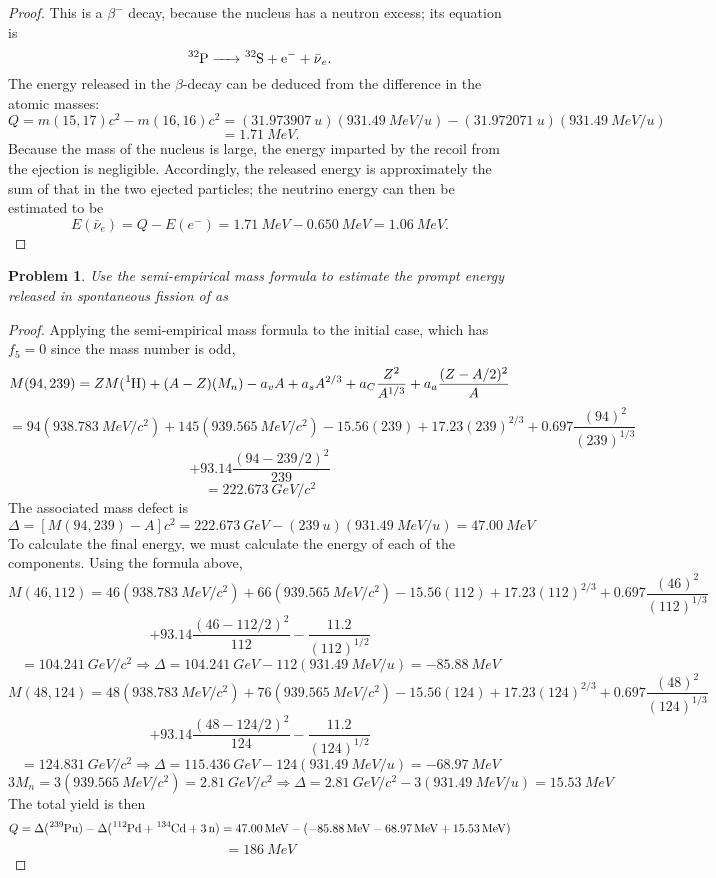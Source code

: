 \documentclass{article}
\newtheorem{plm}{Problem}
\begin{document}
\begin{proof}
  This is a $\beta^{-}$ decay, because the nucleus has a neutron excess; its equation is
  \[
    \ce{^{32}P -> ^{32}S + e^{-} + \bar{\nu}_{e}}.
  \]
  The energy released in the $\beta$-decay can be deduced from the difference in the atomic masses:
  \[
    Q = m(15, 17)c^{2} - m(16, 16)c^{2}
    = (\SI{31.973907}{u})(\SI{931.49}{MeV/u}) - (\SI{31.972071}{u})(\SI{931.49}{MeV/u})
  \]
  \[
    = \SI{1.71}{MeV}.
  \]
  Because the mass of the nucleus is large, the energy imparted by the recoil from the ejection is negligible.
  Accordingly, the released energy is approximately the sum of that in the two ejected particles; the neutrino energy can then be estimated to be
  \[
    E(\bar{\nu}_{e}) = Q - E(e^{-}) = \SI{1.71}{MeV} - \SI{0.650}{MeV} = \SI{1.06}{MeV}.
  \]
\end{proof}

\begin{plm}
  Use the semi-empirical mass formula to estimate the prompt energy released in spontaneous fission of  as
  \begin{center}
  \end{center}
\end{plm}

\begin{proof}
  Applying the semi-empirical mass formula to the initial case, which has $f_{5} = 0$ since the mass number is odd,
  \[
    M(94, 239) = ZM(\ce{^{1}H}) + (A - Z)(M_{n}) - a_{v}A + a_{s}A^{2/3} + a_{C}\frac{Z^{2}}{A^{1/3}} + a_{a}\frac{(Z - A/2)^{2}}{A}
  \]
  \[
     = 94(\SI{938.783}{MeV/c^{2}}) + 145(\SI{939.565}{MeV/c^{2}}) - 15.56(239) + 17.23(239)^{2/3} + 0.697\frac{(94)^{2}}{(239)^{1/3}}
   \]
   \[
     + 93.14\frac{(94 - 239/2)^{2}}{239}
   \]
   \[
     = \SI{222.673}{GeV/c^{2}}
   \]
   The associated mass defect is
   \[
     \Delta = [M(94, 239) - A]c^{2} = \SI{222.673}{GeV} - (\SI{239}{u})(\SI{931.49}{MeV/u}) = \SI{47.00}{MeV}
   \]
   To calculate the final energy, we must calculate the energy of each of the components.
   Using the formula above,
   \[
     M(46, 112) = 46(\SI{938.783}{MeV/c^{2}}) + 66(\SI{939.565}{MeV/c^{2}}) - 15.56(112) + 17.23(112)^{2/3} + 0.697\frac{(46)^{2}}{(112)^{1/3}}
   \]
   \[
     + 93.14\frac{(46 - 112/2)^{2}}{112} - \frac{11.2}{(112)^{1/2}}
   \]
   \[
     = \SI{104.241}{GeV/c^{2}}
     \Rightarrow \Delta = \SI{104.241}{GeV} - 112(\SI{931.49}{MeV/u}) = \SI{-85.88}{MeV}
   \]
   \[
     M(48, 124) = 48(\SI{938.783}{MeV/c^{2}}) + 76(\SI{939.565}{MeV/c^{2}}) - 15.56(124) + 17.23(124)^{2/3} + 0.697\frac{(48)^{2}}{(124)^{1/3}}
   \]
   \[
     + 93.14\frac{(48 - 124/2)^{2}}{124} - \frac{11.2}{(124)^{1/2}}
   \]
   \[
     = \SI{124.831}{GeV/c^{2}}
     \Rightarrow \Delta = \SI{115.436}{GeV} - 124(\SI{931.49}{MeV/u}) = \SI{-68.97}{MeV}
   \]
   \[
     3M_{n} = 3(\SI{939.565}{MeV/c^{2}}) = \SI{2.81}{GeV/c^{2}}
     \Rightarrow \Delta = \SI{2.81}{GeV/c^{2}} - 3(\SI{931.49}{MeV/u}) = \SI{15.53}{MeV}
   \]
   The total yield is then
   \[
     Q = \Delta(\ce{^{239}Pu}) - \Delta(\ce{^{112}Pd + ^{134}Cd + 3n})
     = \SI{47.00}{MeV} - (\SI{-85.88}{MeV} - \SI{68.97}{MeV} + \SI{15.53}{MeV})
   \]
   \[
     = \SI{186}{MeV}
   \]
\end{proof}
\end{document}
